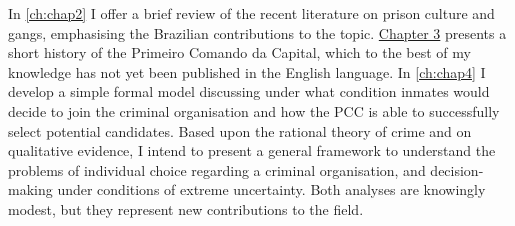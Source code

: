 In \autoref{ch:chap2} I offer a brief review of the recent literature on prison culture and gangs, emphasising the Brazilian contributions to the topic. \hyperlink{page.19}{Chapter 3} presents a short history of the Primeiro Comando da Capital, which to the best of my knowledge has not yet been published in the English language. In \autoref{ch:chap4} I develop a simple formal model discussing under what condition inmates would decide to join the criminal organisation and how the PCC is able to successfully select potential candidates. Based upon the rational theory of crime and on qualitative evidence, I intend to present a general framework to understand the problems of individual choice regarding a criminal organisation, and decision-making under conditions of extreme uncertainty. Both analyses are knowingly modest, but they represent new contributions to the field.



